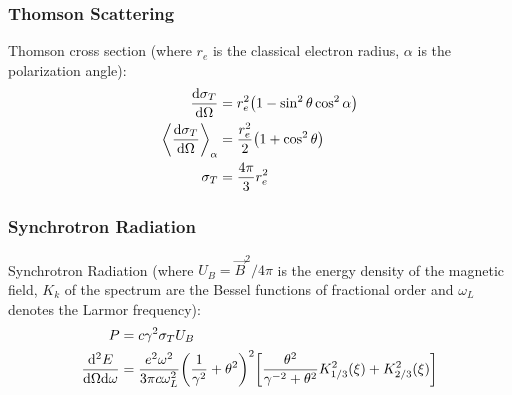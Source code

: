 		\subsubsection{Thomson Scattering}
			Thomson cross section (where $r_e$ is the classical electron radius, $\alpha$ is the polarization angle):
			\begin{equation}
				\begin{aligned}
					\dv{\sigma_T}{\Omega} &= r_e^2 \qty(1-\sin^2 \theta \cos^2 \alpha) \\
					\left\langle \dv{\sigma_T}{\Omega} \right\rangle_{\alpha} &= \frac{r_e^2}{2} \qty(1+\cos^2 \theta) \\
					\sigma_T &= \frac{4\pi}{3}r_e^2 \\
				\end{aligned}
			\end{equation}

		\subsubsection{Synchrotron Radiation}
			\noindent
			Synchrotron Radiation (where $U_B=\vec{B}^2/4\pi$ is the energy density of the magnetic field, $K_k$ of the spectrum are the Bessel functions of fractional order and $\omega_L$ denotes the Larmor frequency):
			\begin{equation}
				\begin{aligned}
					P &= c \gamma^2 \sigma_T U_B \\
					\frac{\dd^2 E}{\dd\Omega\dd\omega} &= \frac{e^2 \omega^2}{3\pi c\omega_L^2} \qty(\frac{1}{\gamma^2} + \theta^2)^2\qty[\frac{\theta^2}{\gamma^{-2}+\theta^2} K_{1/3}^2(\xi) + K_{2/3}^2(\xi)]\\ 
				\end{aligned}
			\end{equation}

